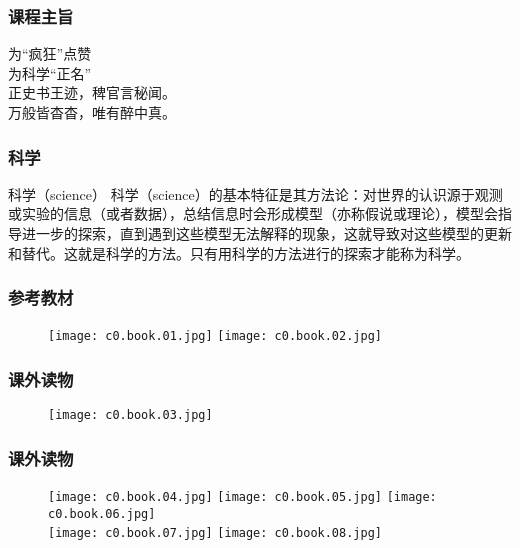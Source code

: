 \begin{frame}[fragile]
  \frametitle{课程主旨}
  \begin{center}
  {\Huge 为“疯狂”点赞\\
    \vspace{0.5cm}
    为科学“正名”}\\
  \vspace{1cm}
  {\Large 正史书王迹，稗官言秘闻。\\
    \vspace{0.2cm}
    万般皆杳杳，唯有醉中真。}
\end{center}
\end{frame}

\begin{frame}
  \frametitle{科学}
  \begin{block}{科学（science）}
科学（science）的基本特征是其方法论：对世界的认识源于观测或实验的信息（或者数据），总结信息时会形成模型（亦称假说或理论），模型会指导进一步的探索，直到遇到这些模型无法解释的现象，这就导致对这些模型的更新和替代。这就是科学的方法。只有用科学的方法进行的探索才能称为科学。
  \end{block}
\end{frame}

\begin{frame}
  \frametitle{参考教材}
  \begin{figure}
    \centering
    \texttt{[image: c0.book.01.jpg]}
    \qquad
    \texttt{[image: c0.book.02.jpg]}
  \end{figure}
\end{frame}

\begin{frame}
  \frametitle{课外读物}
  \begin{figure}
    \centering
    \texttt{[image: c0.book.03.jpg]}
  \end{figure}
\end{frame}

\begin{frame}
  \frametitle{课外读物}
  \begin{figure}
    \centering
    \texttt{[image: c0.book.04.jpg]}\quad
    \texttt{[image: c0.book.05.jpg]}\quad
    \texttt{[image: c0.book.06.jpg]}\\
    \texttt{[image: c0.book.07.jpg]}\hspace{1cm}
    \texttt{[image: c0.book.08.jpg]}
  \end{figure}
\end{frame}

